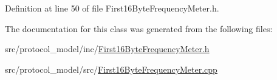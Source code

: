 Definition at line 50 of file First16\-Byte\-Frequency\-Meter.\-h.



The documentation for this class was generated from the following files\-:\begin{DoxyCompactItemize}
\item 
src/protocol\-\_\-model/inc/\hyperlink{_first16_byte_frequency_meter_8h}{First16\-Byte\-Frequency\-Meter.\-h}\item 
src/protocol\-\_\-model/src/\hyperlink{_first16_byte_frequency_meter_8cpp}{First16\-Byte\-Frequency\-Meter.\-cpp}\end{DoxyCompactItemize}

